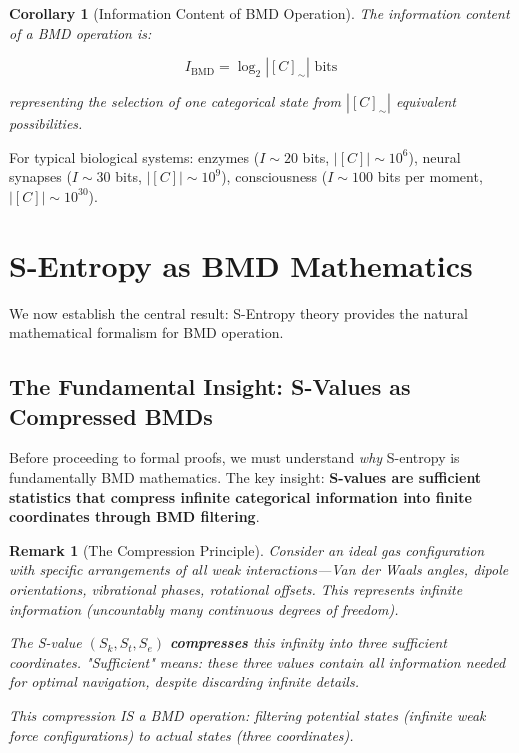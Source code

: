 \documentclass[12pt,a4paper]{article}
\newtheorem{corollary}[theorem]{Corollary}
\newtheorem{remark}[theorem]{Remark}
\begin{document}
\begin{corollary}[Information Content of BMD Operation]
\label{cor:bmd_information}
The information content of a BMD operation is:

\begin{equation}
I_{\text{BMD}} = \log_2 |[C]_{\sim}| \text{ bits}
\end{equation}

representing the selection of one categorical state from $|[C]_{\sim}|$ equivalent possibilities.
\end{corollary}

For typical biological systems: enzymes ($I \sim 20$ bits, $|[C]| \sim 10^6$), neural synapses ($I \sim 30$ bits, $|[C]| \sim 10^9$), consciousness ($I \sim 100$ bits per moment, $|[C]| \sim 10^{30}$).

\section{S-Entropy as BMD Mathematics}

We now establish the central result: S-Entropy theory provides the natural mathematical formalism for BMD operation.

\subsection{The Fundamental Insight: S-Values as Compressed BMDs}

Before proceeding to formal proofs, we must understand \textit{why} S-entropy is fundamentally BMD mathematics. The key insight: \textbf{S-values are sufficient statistics that compress infinite categorical information into finite coordinates through BMD filtering}.

\begin{remark}[The Compression Principle]
\label{rem:compression}
Consider an ideal gas configuration with specific arrangements of all weak interactions—Van der Waals angles, dipole orientations, vibrational phases, rotational offsets. This represents \textit{infinite information} (uncountably many continuous degrees of freedom). 

The S-value $(S_k, S_t, S_e)$ \textbf{compresses} this infinity into three \textit{sufficient} coordinates. "Sufficient" means: these three values contain all information needed for optimal navigation, despite discarding infinite details.

This compression IS a BMD operation: filtering potential states (infinite weak force configurations) to actual states (three coordinates).
\end{remark}
\end{document}
